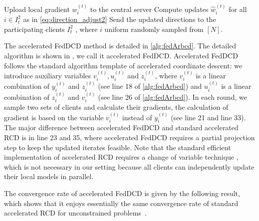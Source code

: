 \begin{algorithm}
{{           Upload local gradient $w_i^{(t)}$ to the central server 
      }
      Compute updates $\hat w_i^{(t)}$ for all $i\in I_t^2$ as in \eqref{eq:direction_adjust2}
      Send the updated directions to the participating clients $I_t^2$ 
    }
    , where $i$ uniform randomly sampled from $[N]$. 
\end{algorithm}


The accelerated FedDCD method is detailed in \autoref{alg:fedArbcd}. 
The detailed algorithm is shown in , we call it accelerated FedDCD. Accelerated FedDCD follows the standard algorithm template of accelerated coordinate descent: we introduce auxiliary variables $v_i^{(t)}, u_i^{(t)}$ and $z_i^{(t)}$, where $v_i^{(t)}$ is a linear combination of $y_i^{(t)}$ and $z_i^{(t)}$ (see line 18 of \autoref{alg:fedArbcd}) and $u_i^{(t)}$ is a linear combination of $z_i^{(t)}$ and $v_i^{(t)}$ (see line 26 of \autoref{alg:fedArbcd}). In each round, we sample two sets of clients and calculate their gradients, the calculation of gradient is based on the variable $v_i^{(t)}$ instead of $y_i^{(t)}$ (see line 21 and line 33).
The major difference between accelerated FedDCD and standard accelerated RCD is in line 23 and 35, where accelerated FedDCD requires a partial projection step to keep the updated iterates feasible.
Note that the standard efficient implementation of accelerated RCD requires a  change of variable technique \citep{LeeS13}, which is not necessary in our setting because all clients can independently update their local models in parallel.

The convergence rate of accelerated FedDCD is given by the following result, which shows that it enjoys essentially the same convergence rate of standard accelerated RCD for unconstrained problems~\citep{LeeS13,Lu18}.

